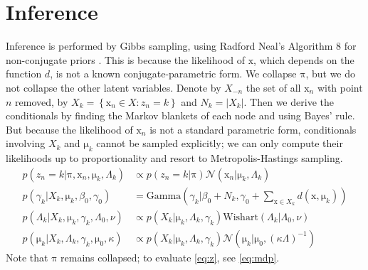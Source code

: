 \documentclass[english]{article}
\newcommand{\+}[1]{\ensuremath{\boldsymbol{\mathrm{#1}}}}
\begin{document}
\section{Inference}
Inference is performed by Gibbs sampling, using Radford Neal's Algorithm 8 for non-conjugate priors \cite{Neal2000}. This is because the likelihood of $\+x$, which depends on the function $d$, is not a known conjugate-parametric form. We collapse $\+\pi$, but we do not collapse the other latent variables. Denote by $X_{-n}$ the set of all $\+x_n$ with point $n$ removed, by $X_k = \left\{ \+x_n \in X : z_n = k \right\}$ and $N_k = | X_k |$. Then we derive the conditionals by finding the Markov blankets of each node and using Bayes' rule. But because the likelihood of $\+x_n$ is not a standard parametric form, conditionals involving $X_k$ and $\+\mu_k$ cannot be sampled explicitly; we can only compute their likelihoods up to proportionality and resort to Metropolis-Hastings sampling.
\begin{align}\label{eq:conds}
p(z_n = k | \+\pi, \+x_n, \+\mu_k, \Lambda_k) &\propto p(z_n = k | \+\pi) \mathcal{N}(\+x_n | \+\mu_k, \Lambda_k) \label{eq:z}\\
p(\gamma_k | X_k, \+\mu_k, \beta_0, \gamma_0) &= \text{Gamma}\left( \gamma_k | \beta_0 + N_k, \gamma_0 + \sum_{\+x \in X_k} d(\+x, \+\mu_k) \right) \label{eq:gamma}\\
p(\Lambda_k | X_k, \+\mu_k, \gamma_k, \Lambda_0, \nu) &\propto  p(X_k | \+\mu_k, \Lambda_k, \gamma_k) \text{Wishart}(\Lambda_k | \Lambda_0, \nu) \label{eq:lambda}\\
p(\+\mu_k | X_k, \Lambda_k, \gamma_k, \+\mu_0, \kappa) &\propto p(X_k | \+\mu_k, \Lambda_k, \gamma_k) \mathcal{N}(\+\mu_k | \+\mu_0, (\kappa\Lambda)^{-1}) \label{eq:mu}
\end{align}
Note that $\+\pi$ remains collapsed; to evaluate \eqref{eq:z}, see \eqref{eq:mdp}.
\end{document}
